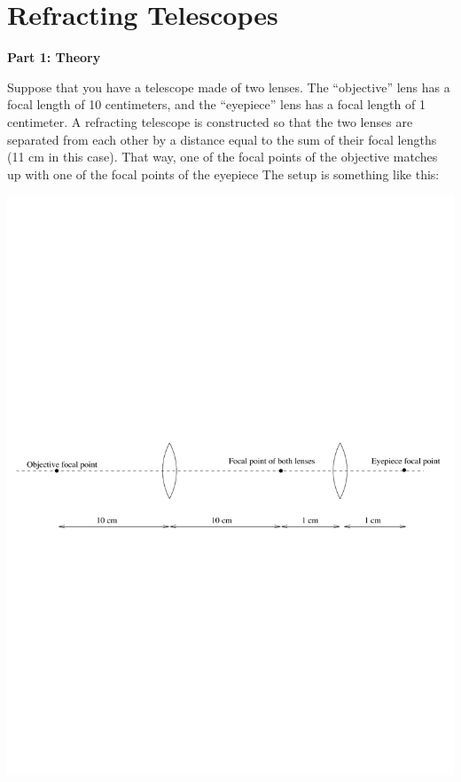 \section{Refracting Telescopes}

\makelabheader

\bigskip
{\bf Part 1: Theory}

Suppose that you have a telescope made of two lenses.  The ``objective''
lens has a focal length of 10 centimeters, and the ``eyepiece'' lens
has a focal length of 1 centimeter.  A refracting telescope is constructed
so that the two lenses are separated from each other by a distance
equal to the sum of their focal lengths (11 cm in this case).  That
way, one of the focal points of the objective matches up with one
of the focal points of the eyepiece
The setup is something like this:

\medskip

\centerline{\includegraphics[width=\textwidth]{telescope/telescopefig1.pdf}}

